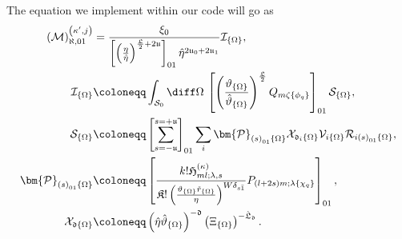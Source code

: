 The equation we implement within our code will go as
\begin{align}
\left(\mathcal{M}\right)_{\aleph,01}^{\left(\kappa^{\prime},j\right)}
    &=
        \frac
        { \xi_{0} }
        {
            \left[
                \left(\frac{\eta}{\hat{\eta}}\right)
                ^{\frac{\mathfrak{L}}{2}+2\mathfrak{u}}
            \right]_{01}
            \hat{\eta}^{ 2\mathfrak{u}_{0} + 2\mathfrak{u}_{1} }
        }
        \mathcal{I}_{\left\{\Omega\right\}}
\label{ex:first_use_of_bracket_summation}
,\\
\mathcal{I}_{\left\{\Omega\right\}}
    &\coloneqq
        \int_{\mathcal{S}_{0}}\diff\Omega
        \,
        \left[
            \left(
                \frac
                {\vartheta_{\left\{\Omega\right\}}}
                {\hat{\vartheta}_{\left\{\Omega\right\}}}
            \right)^{\frac{\mathfrak{L}}{2}}
            Q_{m\zeta\left\{\phi_{q}\right\}}
        \right]_{01}
        \mathcal{S}_{\left\{\Omega\right\}}
,\\
\mathcal{S}_{\left\{\Omega\right\}}
    &\coloneqq
        \left[\sum_{s=-\mathfrak{u}}^{s=+\mathfrak{u}}\right]_{01}
        \sum_{i}
        \bm{\mathcal{P}}_{\left(s\right)_{01}\left\{\Omega\right\}}
        \mathcal{X}_{\mathfrak{d}_{i}\left\{\Omega\right\}}
        \mathcal{V}_{i\left\{\Omega\right\}}
        \mathcal{R}_{i\left(s\right)_{01}\left\{\Omega\right\}}
,\\
\bm{\mathcal{P}}_{\left(s\right)_{01}\left\{\Omega\right\}}
    &\coloneqq
        \left[
            \frac
            { k!\mathfrak{H}_{ml;\lambda,s}^{\left(\kappa\right)} }
            { 
                \mathfrak{K}!
                \left(
                    \frac
                    {
                        \vartheta_{\left\{\Omega\right\}}
                        \check{r}_{\left\{\Omega\right\}}
                    }
                    {\eta}
                \right)^{W\delta_{s\bar{1}}}
            }
            P_{\left(l+2s\right)m;\lambda\left\{\chi_{q}\right\}}
        \right]_{01}
,\\
\mathcal{X}_{\mathfrak{d}\left\{\Omega\right\}}
    &\coloneqq
        \left(
            \hat{\eta}\hat{\vartheta}_{\left\{\Omega\right\}}
        \right)^{-\mathfrak{d}}
        \left( \Xi_{\left\{\Omega\right\}} \right)
        ^{ -\hat{\mathfrak{L}}_{\mathfrak{d}} }
.
\end{align}







